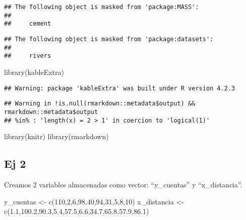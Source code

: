 \documentclass[
]{article}
\newenvironment{Shaded}{\begin{snugshade}}{\end{snugshade}}
\newcommand{\DecValTok}[1]{\textcolor[rgb]{0.00,0.00,0.81}{#1}}
\newcommand{\FloatTok}[1]{\textcolor[rgb]{0.00,0.00,0.81}{#1}}
\newcommand{\FunctionTok}[1]{\textcolor[rgb]{0.00,0.00,0.00}{#1}}
\newcommand{\NormalTok}[1]{#1}
\newcommand{\OtherTok}[1]{\textcolor[rgb]{0.56,0.35,0.01}{#1}}
\begin{document}
\begin{verbatim}
## The following object is masked from 'package:MASS':
## 
##     cement
\end{verbatim}

\begin{verbatim}
## The following object is masked from 'package:datasets':
## 
##     rivers
\end{verbatim}

\begin{Shaded}
\begin{Highlighting}[]
\FunctionTok{library}\NormalTok{(kableExtra)}
\end{Highlighting}
\end{Shaded}

\begin{verbatim}
## Warning: package 'kableExtra' was built under R version 4.2.3
\end{verbatim}

\begin{verbatim}
## Warning in !is.null(rmarkdown::metadata$output) && rmarkdown::metadata$output
## %in% : 'length(x) = 2 > 1' in coercion to 'logical(1)'
\end{verbatim}

\begin{Shaded}
\begin{Highlighting}[]
\FunctionTok{library}\NormalTok{(knitr)}
\FunctionTok{library}\NormalTok{(rmarkdown)}
\end{Highlighting}
\end{Shaded}

\hypertarget{ej-2}{%
\subsection{Ej 2}\label{ej-2}}

Creamos 2 variables almacenadas como vector: ``y\_cuentas'' y
``x\_distancia''.

\begin{Shaded}
\begin{Highlighting}[]
\NormalTok{y\_cuentas }\OtherTok{\textless{}{-}} \FunctionTok{c}\NormalTok{(}\DecValTok{110}\NormalTok{,}\DecValTok{2}\NormalTok{,}\DecValTok{6}\NormalTok{,}\DecValTok{98}\NormalTok{,}\DecValTok{40}\NormalTok{,}\DecValTok{94}\NormalTok{,}\DecValTok{31}\NormalTok{,}\DecValTok{5}\NormalTok{,}\DecValTok{8}\NormalTok{,}\DecValTok{10}\NormalTok{)}
\NormalTok{x\_distancia }\OtherTok{\textless{}{-}} \FunctionTok{c}\NormalTok{(}\FloatTok{1.1}\NormalTok{,}\FloatTok{100.2}\NormalTok{,}\FloatTok{90.3}\NormalTok{,}\FloatTok{5.4}\NormalTok{,}\FloatTok{57.5}\NormalTok{,}\FloatTok{6.6}\NormalTok{,}\FloatTok{34.7}\NormalTok{,}\FloatTok{65.8}\NormalTok{,}\FloatTok{57.9}\NormalTok{,}\FloatTok{86.1}\NormalTok{)}
\end{Highlighting}
\end{Shaded}
\end{document}
